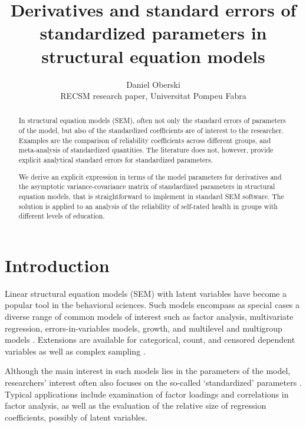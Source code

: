 \documentclass[a4paper, 11pt]{article}
\title{Derivatives and standard errors of standardized parameters in structural
equation models}
\author{Daniel Oberski\\RECSM research paper, Universitat Pompeu Fabra}
\newcommand{\0}{\boldsymbol{0}}
\begin{document}
\maketitle

\begin{abstract}\noindent
In structural equation models (SEM), often not only the standard errors of parameters of the model, but
also of the standardized coefficients are of interest to the researcher. 
Examples are the comparison of reliability coefficients across different groups, and meta-analysis of 
standardized quantities.
The literature does not, however, provide explicit analytical standard errors 
for standardized parameters. %

We derive an explicit expression in terms of the model parameters 
for derivatives and the asymptotic variance-covariance matrix of 
standardized parameters in structural equation models, that is straightforward to implement in standard SEM software. 
The solution is applied to an analysis of the reliability of self-rated health in groups with different levels of education.
\end{abstract}

\section{Introduction}\noindent
Linear structural equation models (SEM) with latent variables
have become a popular tool in the behavioral sciences. Such models encompass as special cases a diverse range of common models of interest such as factor
analysis, multivariate regression, errors-in-variables models, growth, and
multilevel and multigroup models \citep{bollen1989structural}. Extensions are available for categorical, count,
and censored dependent variables as well as complex sampling 
 \citep{muthen1995complex,muthen2002beyond}.

Although the main interest in such models lies in the parameters of 
the model, researchers' interest often also focuses on the so-called 
`standardized' parameters \citep{bollen1989structural}. Typical applications include examination of factor loadings and correlations in factor analysis, as well as the evaluation of the relative size of regression coefficients, possibly of latent variables.
\end{document}
